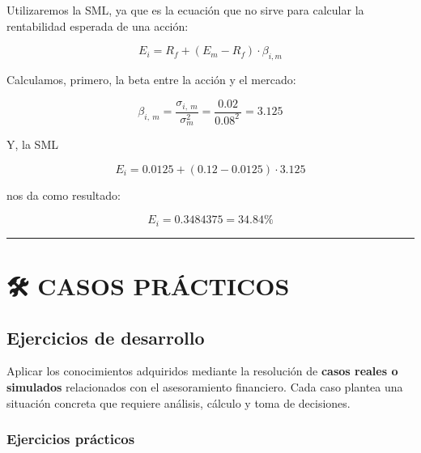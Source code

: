 \documentclass[
  letterpaper,
  DIV=11,
  numbers=noendperiod]{scrreprt}
\begin{document}
\begin{tcolorbox}
\begin{tcolorbox}
Utilizaremos la SML, ya que es la ecuación que no sirve para calcular la
rentabilidad esperada de una acción:

\[E_i=R_f+\left(E_m−R_f\right)⋅β_{i,m}\]

Calculamos, primero, la beta entre la acción y el mercado:

\[\beta _{i,\:m}=\frac{\sigma _{i,\:m}}{\sigma _m^2}=\frac{0.02}{0.08^{2\:}}=3.125\]

Y, la SML

\[E_i=0.0125+\left(0.12−0.0125\right)\cdot 3.125\]

nos da como resultado:

\[E_i=0.3484375=34.84\%\]

\end{tcolorbox}

\begin{center}\rule{0.5\linewidth}{0.5pt}\end{center}

\part{🛠️ CASOS PRÁCTICOS}

\chapter{Ejercicios de desarrollo}\label{ejercicios-de-desarrollo}

\begin{tcolorbox}[enhanced jigsaw, toprule=.15mm, left=2mm, breakable, opacitybacktitle=0.6, toptitle=1mm, coltitle=black, arc=.35mm, leftrule=.75mm, bottomtitle=1mm, titlerule=0mm, title=\textcolor{quarto-callout-note-color}{\faInfo}\hspace{0.5em}{Objetivo de esta sección}, rightrule=.15mm, opacityback=0, bottomrule=.15mm, colback=white, colframe=quarto-callout-note-color-frame, colbacktitle=quarto-callout-note-color!10!white]

Aplicar los conocimientos adquiridos mediante la resolución de
\textbf{casos reales o simulados} relacionados con el asesoramiento
financiero. Cada caso plantea una situación concreta que requiere
análisis, cálculo y toma de decisiones.

\end{tcolorbox}

\section{Ejercicios prácticos}\label{ejercicios-pruxe1cticos-1}


\end{tcolorbox}
\end{document}
